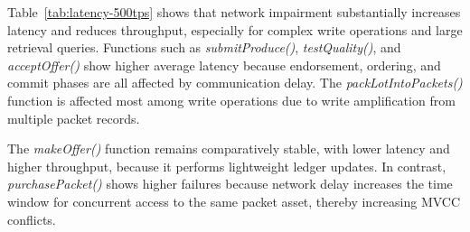 \documentclass[manuscript,screen,nofonts]{acmart}
\begin{document}
\begin{table}[h]
	\centering
	\caption{Performance Comparison of Smart Contract Functions at 500 TPS under Network Impairment}
	\label{tab:latency-500tps}
\end{table}

Table~\ref{tab:latency-500tps} shows that network impairment substantially increases latency and reduces throughput, especially for complex write operations and large retrieval queries. Functions such as \textit{submitProduce()}, \textit{testQuality()}, and \textit{acceptOffer()} show higher average latency because endorsement, ordering, and commit phases are all affected by communication delay. The \textit{packLotIntoPackets()} function is affected most among write operations due to write amplification from multiple packet records.

The \textit{makeOffer()} function remains comparatively stable, with lower latency and higher throughput, because it performs lightweight ledger updates. In contrast, \textit{purchasePacket()} shows higher failures because network delay increases the time window for concurrent access to the same packet asset, thereby increasing MVCC conflicts.
\end{document}
